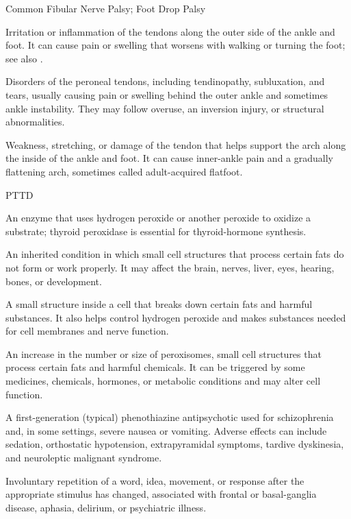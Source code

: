 \synonyms
Common Fibular Nerve Palsy; Foot Drop Palsy

 Irritation or inflammation of the tendons along the outer side of the ankle and foot. It can cause pain or swelling that worsens with walking or turning the foot; see also .

 Disorders of the peroneal tendons, including tendinopathy, subluxation, and tears, usually causing pain or swelling behind the outer ankle and sometimes ankle instability. They may follow overuse, an inversion injury, or structural abnormalities.

 Weakness, stretching, or damage of the tendon that helps support the arch along the inside of the ankle and foot. It can cause inner-ankle pain and a gradually flattening arch, sometimes called adult-acquired flatfoot.

\synonyms
PTTD

 An enzyme that uses hydrogen peroxide or another peroxide to oxidize a substrate; thyroid peroxidase is essential for thyroid-hormone synthesis.

 An inherited condition in which small cell structures that process certain fats do not form or work properly. It may affect the brain, nerves, liver, eyes, hearing, bones, or development.

 A small structure inside a cell that breaks down certain fats and harmful substances. It also helps control hydrogen peroxide and makes substances needed for cell membranes and nerve function.

 An increase in the number or size of peroxisomes, small cell structures that process certain fats and harmful chemicals. It can be triggered by some medicines, chemicals, hormones, or metabolic conditions and may alter cell function.

 A first-generation (typical) phenothiazine antipsychotic used for schizophrenia and, in some settings, severe nausea or vomiting. Adverse effects can include sedation, orthostatic hypotension, extrapyramidal symptoms, tardive dyskinesia, and neuroleptic malignant syndrome.

 Involuntary repetition of a word, idea, movement, or response after the appropriate stimulus has changed, associated with frontal or basal-ganglia disease, aphasia, delirium, or psychiatric illness.

